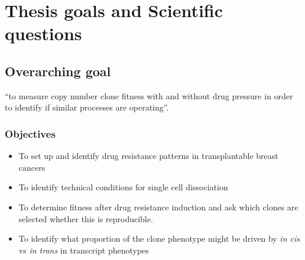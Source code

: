 \section{Thesis goals and Scientific questions}

\subsection{Overarching goal}

``to measure copy number clone fitness with and without drug pressure in order to identify if similar processes are operating''.


\subsubsection{Objectives}
\begin{itemize}
\item{To set up and identify drug resistance patterns in transplantable breast cancers}

\item{To identify technical conditions for single cell dissociation}

\item{To determine fitness after drug resistance induction and ask which clones are selected whether this is reproducible}. 

\item{To identify what proportion of the clone phenotype might be driven by \textit{in cis} vs \textit{in trans}  in transcript phenotypes} 

\end{itemize}

